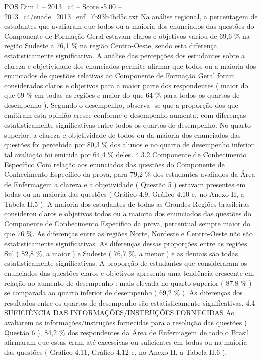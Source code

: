 \begin{textsample}{POS Dim 1 – 2013\_c4 – Score -5.00 – 2013\_c4/enade\_2013\_enf\_7b93b4bd5c.txt}
Na análise regional, a percentagem de estudantes que avaliaram que todos ou a maioria dos enunciados das questões do Componente de Formação Geral estavam claros e objetivos variou de 69,6 \% na região Sudeste a 76,1 \% na região Centro-Oeste, sendo esta diferença estatisticamente significativa.
A análise das percepções dos estudantes sobre a clareza e objetividade dos enunciados permite afirmar que todos ou a maioria dos enunciados de questões relativas ao Componente de Formação Geral foram considerados claros e objetivos para a maior parte dos respondentes ( maior do que 69 \% em todas as regiões e maior do que 64 \% para todos os quartos de desempenho ).
Segundo o desempenho, observa -se que a proporção dos que emitiram esta opinião cresce conforme o desempenho aumenta, com diferenças estatisticamente significativas entre todos os quartos de desempenho.
No quarto superior, a clareza e objetividade de todos ou da maioria dos enunciados das questões foi percebida por 80,3 \% dos alunos e no quarto de desempenho inferior tal avaliação foi emitida por 64,4 \% deles. 4.3.2 Componente de Conhecimento Específico Com relação aos enunciados das questões do Componente de Conhecimento Específico da prova, para 79,2 \% dos estudantes avaliados da Área de Enfermagem a clareza e a objetividade ( Questão 5 ) estavam presentes em todas ou na maioria das questões ( Gráfico 4.9, Gráfico 4.10 e, no Anexo II, a Tabela II.5 ).
A maioria dos estudantes de todas as Grandes Regiões brasileiras considerou claros e objetivos todos ou a maioria dos enunciados das questões do Componente de Conhecimento Específico da prova, percentual sempre maior do que 76 \%.
As diferenças entre as regiões Norte, Nordeste e Centro-Oeste não são estatisticamente significativas.
As diferenças dessas proporções entre as regiões Sul ( 82,8 \%, a maior ) e Sudeste ( 76,7 \%, a menor ) e as demais são todas estatisticamente significativas.
A proporção de estudantes que consideraram os enunciados das questões claros e objetivos apresenta uma tendência crescente em relação ao aumento de desempenho : mais elevada no quarto superior ( 87,8 \% ) se comparada ao quarto inferior de desempenho ( 69,2 \% ).
As diferenças dos resultados entre os quartos de desempenho são estatisticamente significativas. 4.4 SUFICIÊNCIA DAS INFORMAÇÕES/INSTRUÇÕES FORNECIDAS Ao avaliarem as informações/instruções fornecidas para a resolução das questões ( Questão 6 ), 84,2 \% dos respondentes da Área de Enfermagem de todo o Brasil afirmaram que estas eram até excessivas ou suficientes em todas ou na maioria das questões ( Gráfico 4.11, Gráfico 4.12 e, no Anexo II, a Tabela II.6 ).

\end{textsample}
